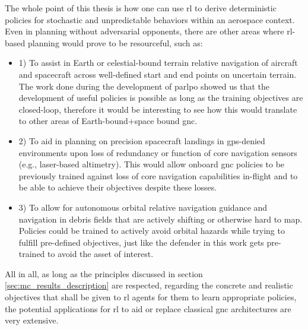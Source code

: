 The whole point of this thesis is how one can use \acs{rl} to derive deterministic policies for stochastic and unpredictable behaviors within an aerospace context. Even in planning without adversarial opponents, there are other areas where \acs{rl}-based planning would prove to be resourceful, such as:

\begin{itemize}

    \item 1) To assist in Earth or celestial-bound terrain relative navigation of aircraft and spacecraft across well-defined start and end points on uncertain terrain. The work done during the development of \acs{parlpo} showed us that the development of useful policies is possible as long as the training objectives are closed-loop, therefore it would be interesting to see how this would translate to other areas of Earth-bound+space bound \acs{gnc}.
    
    
    \item 2) To aid in planning on precision spacecraft landings in \acs{gps}-denied environments upon loss of redundancy or function of core navigation sensors (e.g., laser-based altimetry). This would allow onboard \acs{gnc} policies to be previously trained against loss of core navigation capabilities in-flight and to be able to achieve their objectives despite these losses.

    \item 3) To allow for autonomous orbital relative navigation guidance and navigation in debris fields that are actively shifting or otherwise hard to map. Policies could be trained to actively avoid orbital hazards while trying to fulfill pre-defined objectives, just like the defender in this work gets pre-trained to avoid the asset of interest.
\end{itemize}


All in all, as long as the principles discussed in section \ref{sec:mc_results_description} are respected, regarding the concrete and realistic objectives that shall be given to \acs{rl} agents for them to learn appropriate policies, the potential applications for \acs{rl} to aid or replace classical \acs{gnc} architectures are very extensive.
